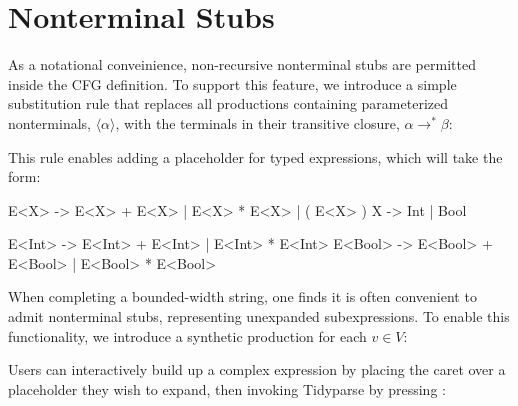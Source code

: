 \documentclass[sigplan,review,anonymous,acmsmall]{acmart}\settopmatter{printfolios=false,printccs=false,printacmref=false}
\begin{document}
\section{Nonterminal Stubs}

\noindent As a notational conveinience, non-recursive nonterminal stubs are permitted inside the CFG definition. To support this feature, we introduce a simple substitution rule that replaces all productions containing parameterized nonterminals, $\langle\alpha\rangle$, with the terminals in their transitive closure, $\alpha \rightarrow^* \beta$:

\begin{figure}[H]
    \begin{prooftree}
    \end{prooftree}
\end{figure}

\noindent This rule enables adding a placeholder for typed expressions, which will take the form:

\begin{tidyinput}
E<X> -> E<X> + E<X> | E<X> * E<X> | ( E<X> )
X -> Int | Bool
\end{tidyinput}

\begin{tidyinput}
E<Int> -> E<Int> + E<Int> | E<Int> * E<Int>
E<Bool> -> E<Bool> + E<Bool> | E<Bool> * E<Bool>
\end{tidyinput}

When completing a bounded-width string, one finds it is often convenient to admit nonterminal stubs, representing unexpanded subexpressions. To enable this functionality, we introduce a synthetic production for each $v \in V$:

\begin{prooftree}
\end{prooftree}

Users can interactively build up a complex expression by placing the caret over a placeholder they wish to expand, then invoking Tidyparse by pressing \keys{\ctrl + \SPACE}:
\end{document}
